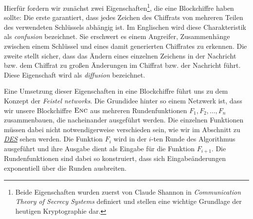 Hierfür fordern wir zunächst zwei Eigenschaften\footnote{Beide Eigenschaften wurden zuerst von Claude Shannon in \emph{Communication Theory of Secrecy Systems} \cite{Shannon1949} definiert und stellen eine wichtige Grundlage der heutigen Kryptographie dar.}, die eine Blockchiffre haben sollte:
Die erste garantiert, dass jedes Zeichen des Chiffrats von mehreren Teilen des verwendeten Schlüssels abhängig ist. Im Englischen wird diese Charakteristik als \emph{confusion} bezeichnet. Sie erschwert es einem Angreifer, Zusammenhänge zwischen einem Schlüssel und eines damit generierten Chiffrates zu erkennen. 
Die zweite stellt sicher, dass das Ändern eines einzelnen Zeichens in der Nachricht bzw. dem Chiffrat zu großen Änderungen im Chiffrat bzw. der Nachricht führt. Diese Eigenschaft wird als \emph{diffusion} bezeichnet.

Eine Umsetzung dieser Eigenschaften in eine Blockchiffre führt uns zu dem Konzept der \emph{Feistel networks}.
Die Grundidee hinter so einem Netzwerk ist, dass wir unsere Blockchiffre \(\textsc{Enc}\) aus mehreren Rundenfunktionen \(F_1, F_2,\dots, F_n\) zusammenbauen, die nacheinander ausgeführt werden. Die einzelnen Funktionen müssen dabei nicht notwendigerweise verschieden sein, wie wir im Abschnitt zu \hyperref[sssec:des]{\emph{DES}} sehen werden. Die Funktion \(F_i\) wird in der $i$-ten Runde des Algorithmus ausgeführt und ihre Ausgabe dient als Eingabe für die Funktion \(F_{i+1}\). Die Rundenfunktionen sind dabei so konstruiert, dass sich Eingabeänderungen exponentiell über die Runden ausbreiten.


